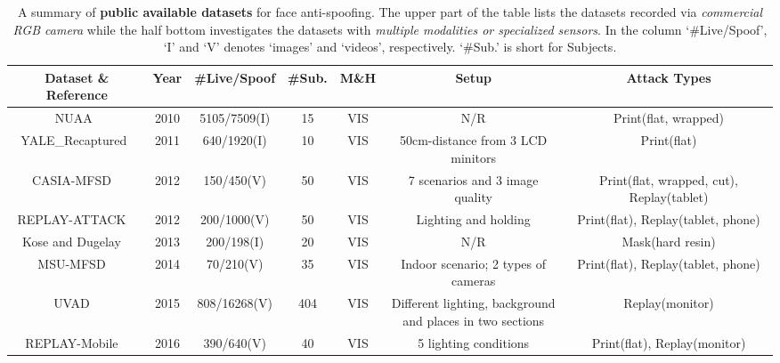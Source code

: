 \documentclass[10pt,journal,compsoc]{IEEEtran}
\begin{document}
\begin{table}
\centering
\caption{A summary of \textbf{public available datasets} for face anti-spoofing. The upper part of the table lists the datasets recorded via \textit{commercial RGB camera} while the half bottom investigates the datasets with \textit{multiple modalities or specialized sensors}. In the column `\#Live/Spoof', `I' and `V' denotes `images' and `videos', respectively. `\#Sub.' is short for Subjects.} \label{tab:dataset}
\resizebox{0.96\textwidth}{!} {\begin{tabular}{c c c c c c c} 
 \toprule[1pt]
 Dataset \& Reference & Year & \#Live/Spoof & \#Sub. & M\&H & Setup & Attack Types \\
 \midrule
 NUAA~\cite{tan2010face} & 2010 & 5105/7509(I) & 15  & VIS & N/R & Print(flat, wrapped)\\

 \midrule
 YALE\_Recaptured~\cite{peixoto2011face} & 2011 & 640/1920(I) & 10  & VIS & 50cm-distance from 3 LCD minitors & Print(flat)\\

 \midrule
 CASIA-MFSD
~\cite{Zhang2012A} & 2012 & 150/450(V) & 50 & VIS & 7 scenarios and 3 image quality & Print(flat, wrapped, cut), Replay(tablet)\\

 \midrule
REPLAY-ATTACK
~\cite{ReplayAttack} & 2012 & 200/1000(V) & 50 & VIS &  Lighting and holding  & Print(flat), Replay(tablet, phone)\\


 \midrule
Kose and Dugelay
~\cite{kose2013shape} & 2013 & 200/198(I) & 20 & VIS &  N/R  & Mask(hard resin)\\



 \midrule
MSU-MFSD
~\cite{wen2015face} & 2014 & 70/210(V) & 35 & VIS &  Indoor scenario; 2 types of cameras & Print(flat), Replay(tablet, phone)\\



 \midrule
UVAD
~\cite{pinto2015using} & 2015 & 808/16268(V) & 404 & VIS &  \tabincell{c}{Different lighting, background \\and places in two sections}  & Replay(monitor)\\

 \midrule
REPLAY-Mobile
~\cite{costa2016replay} & 2016 & 390/640(V) & 40 & VIS &  5 lighting conditions & Print(flat), Replay(monitor)\\


\end{tabular}}
\end{table}
\end{document}
